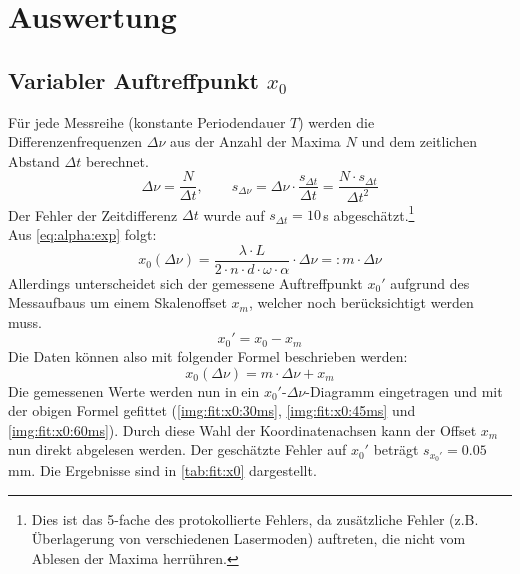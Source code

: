 \section{Auswertung}
\subsection{Variabler Auftreffpunkt \texorpdfstring{$x_0$}{x0}}
Für jede Messreihe (konstante Periodendauer $T$) werden die Differenzenfrequenzen $\Delta \nu$ aus der Anzahl der Maxima $N$ und dem zeitlichen 
Abstand $\Delta t$ berechnet.
\begin{equation}
  \label{eq:delta_nu}
  \Delta \nu = \frac{N}{\Delta t}, \qquad s_{\Delta \nu} = \Delta \nu \cdot \frac{s_{\Delta t}}{\Delta t} = \frac{N \cdot s_{\Delta t}}{\Delta t^2}
\end{equation}
Der Fehler der Zeitdifferenz $\Delta t$ wurde auf $s_{\Delta t} = 10$\,\textmu s abgeschätzt.\footnote{Dies ist das 5-fache des protokollierte Fehlers, da 
zusätzliche Fehler (z.B. Überlagerung von verschiedenen Lasermoden) auftreten, die nicht vom Ablesen der Maxima herrühren.} \\
Aus \autoref{eq:alpha:exp} folgt:
\begin{equation}
  \label{eq:x0:m}
  x_0(\Delta \nu) = \frac{\lambda \cdot L}{2 \cdot n \cdot d \cdot \omega \cdot \alpha} \cdot \Delta \nu =: m \cdot \Delta \nu
\end{equation}
Allerdings unterscheidet sich der gemessene Auftreffpunkt $x_0'$ aufgrund des Messaufbaus um einem Skalenoffset $x_m$, 
welcher noch berücksichtigt werden muss.
\begin{equation}
  x_0' = x_0 - x_m
\end{equation}
Die Daten können also mit folgender Formel beschrieben werden:
\begin{equation}
  x_0(\Delta \nu) = m \cdot \Delta \nu + x_m
\end{equation}
Die gemessenen Werte werden nun in ein $x_0'$-$\Delta \nu$-Diagramm eingetragen und mit der obigen Formel gefittet 
(\autoref{img:fit:x0:30ms}, \autoref{img:fit:x0:45ms} und \autoref{img:fit:x0:60ms}). Durch diese Wahl der Koordinatenachsen kann der Offset $x_m$ 
nun direkt abgelesen werden.
Der geschätzte Fehler auf $x_0'$ beträgt $s_{x_0'} = 0.05$\,mm. Die Ergebnisse sind in \autoref{tab:fit:x0} dargestellt.

